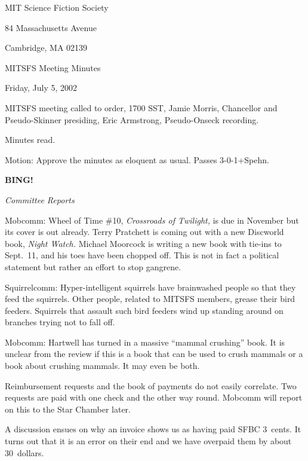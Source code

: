 \documentclass[12pt]{article}
\newcommand{\bing}{{\bf BING!} }
\newcommand{\goto}[1]{\bing \vskip 12pt \centerline{{\em{#1}}}}
\begin{document}
\begin{center}

MIT Science Fiction Society 

84 Massachusetts Avenue

Cambridge, MA 02139

\vspace{12pt}

MITSFS Meeting Minutes 

Friday, July 5, 2002

\end{center}
 
\vspace{18pt}

\setlength{\parskip}{6pt}

\noindent
MITSFS meeting called to order, 1700 SST, Jamie Morris, Chancellor and
Pseudo-Skinner presiding, Eric Armstrong, Pseudo-Onseck recording.

Minutes read.

Motion: Approve the minutes as eloquent as usual. Passes 3-0-1+Spehn.

\goto{Committee Reports}
                                      
Mobcomm: Wheel of Time \#10, \emph{Crossroads of Twilight,} is due
in November but its cover is out already.  Terry Pratchett is coming 
out with a new Discworld book, \emph{Night Watch.}  Michael Moorcock is
writing a new book with tie-ins to Sept.~11, and his toes have been chopped
off.  This is not in fact a political statement but rather an effort to
stop gangrene.

Squirrelcomm: Hyper-intelligent squirrels have brainwashed people so
that they feed the squirrels. Other people, related to MITSFS members,
grease their bird feeders. Squirrels that assault such bird feeders
wind up standing around on branches trying not to fall off.

Mobcomm: Hartwell has turned in a massive ``mammal crushing'' book. It is
unclear from the review if this is a book that can be used to crush
mammals or a book about crushing mammals. It may even be both.

Reimbursement requests and the book of payments do not easily
correlate. Two requests are paid with one check and the other way
round. Mobcomm will report on this to the Star Chamber later.

A discussion ensues on why an invoice shows us as having paid SFBC
3~cents. It turns out that it is an error on their end and we have
overpaid them by about 30~dollars.
\end{document}
